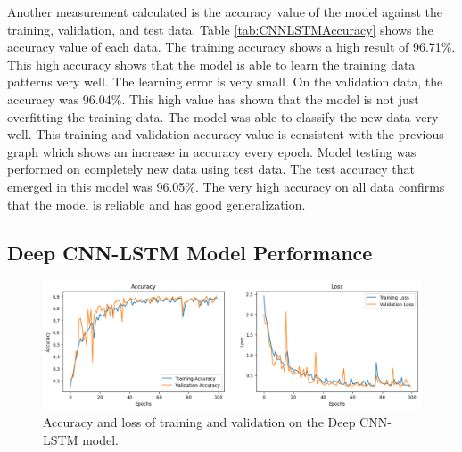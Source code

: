 Another measurement calculated is the accuracy value of the model against the training, validation, and test data. Table \ref{tab:CNNLSTMAccuracy} shows the accuracy value of each data. The training accuracy shows a high result of 96.71\%. This high accuracy shows that the model is able to learn the training data patterns very well. The learning error is very small. On the validation data, the accuracy was 96.04\%. This high value has shown that the model is not just overfitting the training data. The model was able to classify the new data very well. This training and validation accuracy value is consistent with the previous graph which shows an increase in accuracy every epoch. Model testing was performed on completely new data using test data. The test accuracy that emerged in this model was 96.05\%. The very high accuracy on all data confirms that the model is reliable and has good generalization.

\subsection{Deep CNN-LSTM Model Performance}
\label{subsec4:DeepCNNLSTMPerformance}

\begin{figure}[h!]
	\centering
	\includegraphics[width=1\textwidth]{bab4/ar_DeepCNNLSTM_AccLoss.png}
	\caption{Accuracy and loss of training and validation on the Deep CNN-LSTM model.}
	\label{fig:DeepCNNLSTM_AccLoss}
\end{figure}

